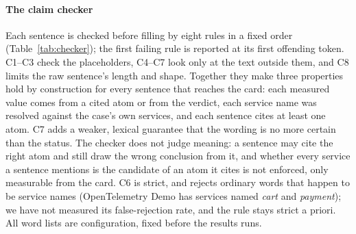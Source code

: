 \paragraph{The claim checker}
Each sentence is checked before filling by eight rules in a fixed order (Table~\ref{tab:checker}); the first failing rule is reported at its first offending token.
C1--C3 check the placeholders, C4--C7 look only at the text outside them, and C8 limits the raw sentence's length and shape.
Together they make three properties hold by construction for every sentence that reaches the card: each measured value comes from a cited atom or from the verdict, each service name was resolved against the case's own services, and each sentence cites at least one atom.
C7 adds a weaker, lexical guarantee that the wording is no more certain than the status.
The checker does not judge meaning: a sentence may cite the right atom and still draw the wrong conclusion from it, and whether every service a sentence mentions is the candidate of an atom it cites is not enforced, only measurable from the card.
C6 is strict, and rejects ordinary words that happen to be service names (OpenTelemetry Demo has services named \emph{cart} and \emph{payment}); we have not measured its false-rejection rate, and the rule stays strict a priori.
All word lists are configuration, fixed before the results runs.

